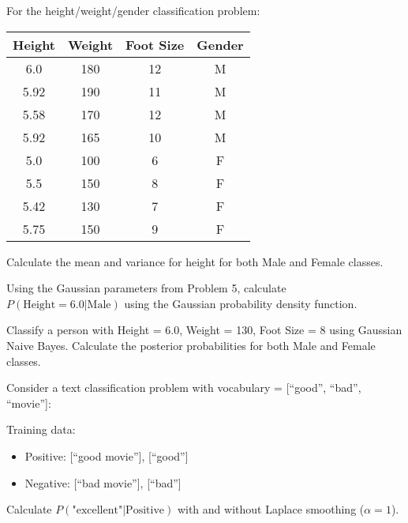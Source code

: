 \documentclass{article}
\newcounter{exercise}
\begin{document}
\begin{tcolorbox}[colback=gray!5!white,colframe=gray!75!black,title=Problem \stepcounter{exercise}: Gaussian Naive Bayes Setup]

For the height/weight/gender classification problem:

\begin{center}
\begin{tabular}{|c|c|c|c|}
\hline
Height & Weight & Foot Size & Gender \\
\hline
6.0 & 180 & 12 & M \\
5.92 & 190 & 11 & M \\
5.58 & 170 & 12 & M \\
5.92 & 165 & 10 & M \\
5.0 & 100 & 6 & F \\
5.5 & 150 & 8 & F \\
5.42 & 130 & 7 & F \\
5.75 & 150 & 9 & F \\
\hline
\end{tabular}
\end{center}

Calculate the mean and variance for height for both Male and Female classes.
\end{tcolorbox}

\begin{tcolorbox}[colback=gray!5!white,colframe=gray!75!black,title=Problem \stepcounter{exercise}: Gaussian Probability Calculation]

Using the Gaussian parameters from Problem 5, calculate $P(\text{Height} = 6.0|\text{Male})$ using the Gaussian probability density function.
\end{tcolorbox}

\begin{tcolorbox}[colback=gray!5!white,colframe=gray!75!black,title=Problem \stepcounter{exercise}: Complete Gaussian Classification]

Classify a person with Height = 6.0, Weight = 130, Foot Size = 8 using Gaussian Naive Bayes. Calculate the posterior probabilities for both Male and Female classes.
\end{tcolorbox}

\begin{tcolorbox}[colback=gray!5!white,colframe=gray!75!black,title=Problem \stepcounter{exercise}: Laplace Smoothing]

Consider a text classification problem with vocabulary = [``good'', ``bad'', ``movie'']:

Training data:
\begin{itemize}
    \item Positive: [``good movie''], [``good'']
    \item Negative: [``bad movie''], [``bad'']
\end{itemize}

Calculate $P(\text{"excellent"}|\text{Positive})$ with and without Laplace smoothing ($\alpha = 1$).
\end{tcolorbox}
\end{document}
